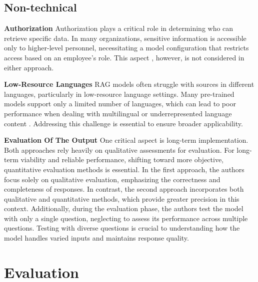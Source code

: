 \documentclass[%
    paper=A4,                    %
    twoside=true,               %
    openright,                  %
    parskip=full,               %
    chapterprefix=true,         %
    11pt,                       %
    headings=normal,            %
    bibliography=totoc,         %
    listof=totoc,              %
    titlepage=on,              %
    captions=tableabove,        %
    draft=false,               %
]{scrreprt}%
\begin{document}
   
   
   
   
    
    
    \section{Non-technical}
    
   
    
 

    

   
   \textbf{Authorization}\hspace{0.5em}
   Authorization plays a critical role in determining who can retrieve specific data. In many organizations, sensitive information is accessible only to higher-level personnel, necessitating a model configuration that restricts access based on an employee’s role. This aspect , however, is not considered in either approach.
   
   
   \textbf{Low-Resource Languages}\hspace{0.5em}
   RAG models often struggle with sources in different languages, particularly in low-resource language settings. Many pre-trained models support only a limited number of languages, which can lead to poor performance when dealing with multilingual or underrepresented language content \cite{chirkova2024retrieval}. Addressing this challenge is essential to ensure broader applicability.


    \textbf{Evaluation Of The Output}
    One critical aspect is long-term implementation. Both approaches rely heavily on qualitative assessments for evaluation. For long-term viability and reliable performance, shifting toward more objective, quantitative evaluation methods is essential.
     In the first approach, the authors focus solely on qualitative evaluation, emphasizing the correctness and completeness of responses. In contrast, the second approach incorporates both qualitative and quantitative methods, which provide greater precision in this context.
    Additionally, during the evaluation phase, the authors test the model with only a single question, neglecting to assess its performance across multiple questions. Testing with diverse questions is crucial to understanding how the model handles varied inputs and maintains response quality.
    



\chapter{Evaluation}
\label{evaluation}
\end{document}
